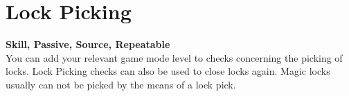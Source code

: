 \section{Lock Picking}\label{sec:lockPicking}
\textbf{Skill, Passive, Source, Repeatable}\\
You can add your relevant game mode level to checks concerning the picking of locks.
Lock Picking checks can also be used to close locks again.
Magic locks usually can not be picked by the means of a lock pick.